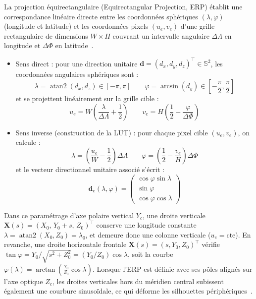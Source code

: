 \documentclass[11pt,a4paper]{article}
\renewcommand{\emph}[1]{\textup{#1}}
\begin{document}
La projection équirectangulaire (\emph{Equirectangular Projection}, ERP) établit une correspondance linéaire directe entre les coordonnées sphériques $(\lambda, \varphi)$ (longitude et latitude) et les coordonnées pixels $(u_e, v_e)$ d'une grille rectangulaire de dimensions $W \times H$ couvrant un intervalle angulaire $\Delta\Lambda$ en longitude et $\Delta\Phi$ en latitude~\cite{ohashi2017,su2017spherical}.
\begin{itemize}
  \item \emph{Sens direct :} pour une direction unitaire $\mathbf{d} = (d_x, d_y, d_z)^\top \in \mathbb{S}^2$, les coordonnées angulaires sphériques sont :
  \begin{equation}
    \lambda = \operatorname{atan2}(d_x, d_z) \in [-\pi, \pi] \qquad
    \varphi = \arcsin(d_y) \in \left[-\frac{\pi}{2}, \frac{\pi}{2}\right]
  \end{equation}
  et se projettent linéairement sur la grille cible :
  \begin{equation}
    u_e = W\left(\frac{\lambda}{\Delta\Lambda} + \frac{1}{2}\right) \qquad
    v_e = H\left(\frac{1}{2} - \frac{\varphi}{\Delta\Phi}\right)
  \end{equation}
  \item \emph{Sens inverse (construction de la LUT) :} pour chaque pixel cible $(u_e, v_e)$, on calcule :
  \begin{equation}
    \lambda = \left(\frac{u_e}{W} - \frac{1}{2}\right)\Delta\Lambda \qquad
    \varphi = \left(\frac{1}{2} - \frac{v_e}{H}\right)\Delta\Phi
  \end{equation}
  et le vecteur directionnel unitaire associé s'écrit :
  \begin{equation}
    \mathbf{d}_e(\lambda, \varphi) = \begin{pmatrix} \cos\varphi\sin\lambda \\ \sin\varphi \\ \cos\varphi\cos\lambda \end{pmatrix}
  \end{equation}
\end{itemize}


Dans ce paramétrage d'axe polaire vertical $Y_c$, une droite verticale $\mathbf{X}(s) = (X_0, \, Y_0 + s, \, Z_0)^\top$ conserve une longitude constante $\lambda = \operatorname{atan2}(X_0, Z_0) = \lambda_0$, et demeure donc une colonne verticale ($u_e = \text{cte}$). En revanche, une droite horizontale frontale $\mathbf{X}(s) = (s, Y_0, Z_0)^\top$ vérifie $\tan\varphi = Y_0 / \sqrt{s^2 + Z_0^2} = (Y_0 / Z_0)\cos\lambda$, soit la courbe $
  \varphi(\lambda) = \arctan\!\left(\frac{Y_0}{Z_0}\cos\lambda\right)$.
Lorsque l'ERP est définie avec ses pôles alignés sur l'axe optique $Z_c$, les droites verticales hors du méridien central subissent également une courbure sinusoïdale, ce qui déforme les silhouettes périphériques~\cite{guerreroviu2020}.
\end{document}
